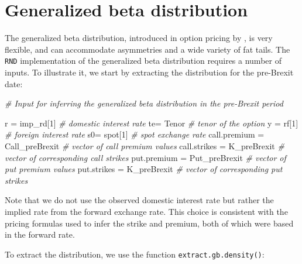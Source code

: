 \documentclass[]{book}
\newenvironment{Shaded}{\begin{snugshade}}{\end{snugshade}}
\newcommand{\DecValTok}[1]{\textcolor[rgb]{0.00,0.00,0.81}{#1}}
\newcommand{\StringTok}[1]{\textcolor[rgb]{0.31,0.60,0.02}{#1}}
\newcommand{\CommentTok}[1]{\textcolor[rgb]{0.56,0.35,0.01}{\textit{#1}}}
\newcommand{\NormalTok}[1]{#1}
\theoremstyle{definition}
\theoremstyle{definition}
\theoremstyle{definition}
\theoremstyle{remark}
\begin{document}
\section{Generalized beta
distribution}\label{generalized-beta-distribution}

The generalized beta distribution, introduced in option pricing by
\citet{Bookstaber-McDonald1987}, is very flexible, and can accommodate
asymmetries and a wide variety of fat tails. The \texttt{RND}
implementation of the generalized beta distribution requires a number of
inputs. To illustrate it, we start by extracting the distribution for
the pre-Brexit date:

\begin{Shaded}
\begin{Highlighting}[]
\CommentTok{# Input for inferring the generalized beta distribution in the pre-Brexit period}

\NormalTok{r =}\StringTok{ }\NormalTok{imp_rd[}\DecValTok{1}\NormalTok{]                      }\CommentTok{# domestic interest rate}
\NormalTok{te=}\StringTok{ }\NormalTok{Tenor                          }\CommentTok{# tenor of the option}
\NormalTok{y =}\StringTok{ }\NormalTok{rf[}\DecValTok{1}\NormalTok{]                          }\CommentTok{# foreign interest rate}
\NormalTok{s0=}\StringTok{ }\NormalTok{spot[}\DecValTok{1}\NormalTok{]                        }\CommentTok{# spot exchange rate}
\NormalTok{call.premium =}\StringTok{ }\NormalTok{Call_preBrexit      }\CommentTok{# vector of call premium values}
\NormalTok{call.strikes =}\StringTok{ }\NormalTok{K_preBrexit         }\CommentTok{# vector of corresponding call strikes}
\NormalTok{put.premium =}\StringTok{ }\NormalTok{Put_preBrexit        }\CommentTok{# vector of put premium values}
\NormalTok{put.strikes =}\StringTok{ }\NormalTok{K_preBrexit          }\CommentTok{# vector of corresponding put strikes}
\end{Highlighting}
\end{Shaded}

Note that we do not use the observed domestic interest rate but rather
the implied rate from the forward exchange rate. This choice is
consistent with the pricing formulas used to infer the strike and
premium, both of which were based in the forward rate.

To extract the distribution, we use the function
\texttt{extract.gb.density()}:
\end{document}
